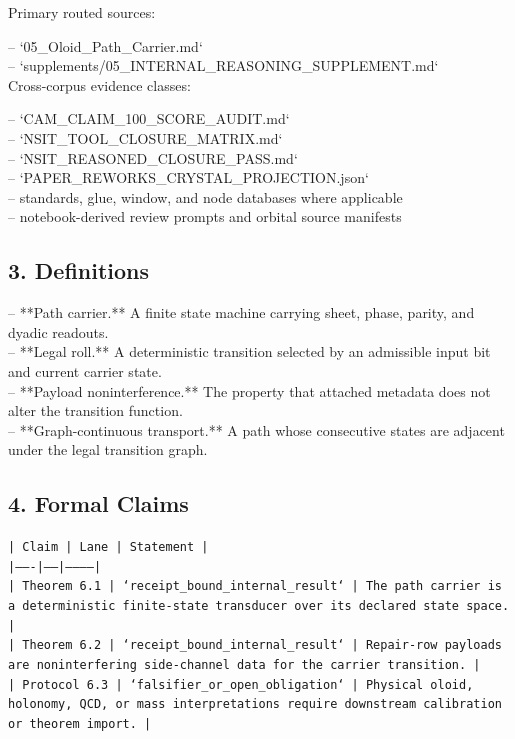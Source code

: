 \documentclass[11pt]{article}
\begin{document}
Primary routed sources:

\noindent{}-- `05\_Oloid\_Path\_Carrier.md`\\
\noindent{}-- `supplements/05\_INTERNAL\_REASONING\_SUPPLEMENT.md`\\

Cross-corpus evidence classes:

\noindent{}-- `CAM\_CLAIM\_100\_SCORE\_AUDIT.md`\\
\noindent{}-- `NSIT\_TOOL\_CLOSURE\_MATRIX.md`\\
\noindent{}-- `NSIT\_REASONED\_CLOSURE\_PASS.md`\\
\noindent{}-- `PAPER\_REWORKS\_CRYSTAL\_PROJECTION.json`\\
\noindent{}-- standards, glue, window, and node databases where applicable\\
\noindent{}-- notebook-derived review prompts and orbital source manifests\\

\subsection*{3. Definitions}

\noindent{}-- **Path carrier.** A finite state machine carrying sheet, phase, parity, and dyadic readouts.\\
\noindent{}-- **Legal roll.** A deterministic transition selected by an admissible input bit and current carrier state.\\
\noindent{}-- **Payload noninterference.** The property that attached metadata does not alter the transition function.\\
\noindent{}-- **Graph-continuous transport.** A path whose consecutive states are adjacent under the legal transition graph.\\

\subsection*{4. Formal Claims}

\noindent\texttt{| Claim | Lane | Statement |}\\
\noindent\texttt{|-------|------|-----------|}\\
\noindent\texttt{| Theorem 6.1 | `receipt\_bound\_internal\_result` | The path carrier is a deterministic finite-state transducer over its declared state space. |}\\
\noindent\texttt{| Theorem 6.2 | `receipt\_bound\_internal\_result` | Repair-row payloads are noninterfering side-channel data for the carrier transition. |}\\
\noindent\texttt{| Protocol 6.3 | `falsifier\_or\_open\_obligation` | Physical oloid, holonomy, QCD, or mass interpretations require downstream calibration or theorem import. |}\\
\end{document}

